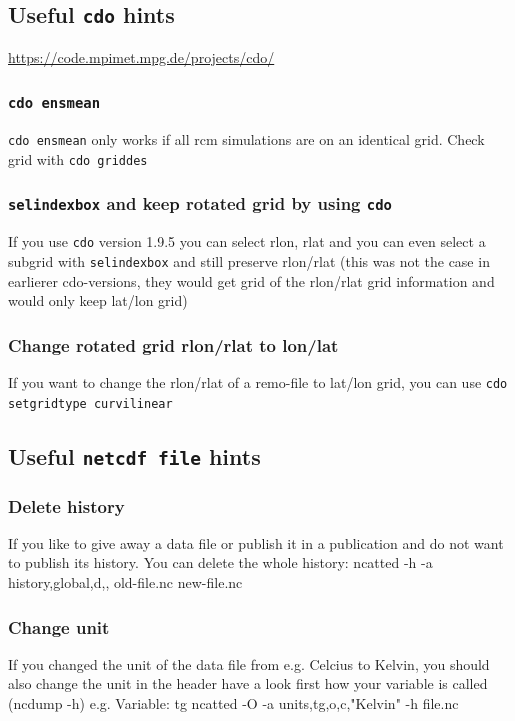 \subsection{Useful \texttt{cdo} hints}
\url{https://code.mpimet.mpg.de/projects/cdo/}

\subsubsection{\texttt{cdo ensmean}}
\texttt{cdo ensmean} only works if all rcm simulations are on an identical grid.
Check grid with \texttt{cdo griddes}

\subsubsection{\texttt{selindexbox} and keep rotated grid by using \texttt{cdo}}
If you use \texttt{cdo} version 1.9.5 you can select rlon, rlat and you can even select a subgrid with \texttt{selindexbox} and still preserve rlon/rlat
(this was not the case in earlierer cdo-versions, they would get grid of the rlon/rlat grid information and would only keep lat/lon grid)

\subsubsection{Change rotated grid rlon/rlat to lon/lat}
If you want to change the rlon/rlat of a remo-file to lat/lon grid, you can use \texttt{cdo setgridtype curvilinear}

\subsection{Useful \texttt{netcdf file} hints}

\subsubsection{Delete history}
If you like to give away a data file or publish it in a publication and do not want to publish its history. 
You can delete the whole history:
ncatted -h -a history,global,d,, old-file.nc new-file.nc

\subsubsection{Change unit}
If you changed the unit of the data file from e.g. Celcius to Kelvin, you should also change the unit in the header
have a look first how your variable is called  (ncdump -h) 
e.g. Variable: tg
ncatted -O -a units,tg,o,c,"Kelvin" -h file.nc

